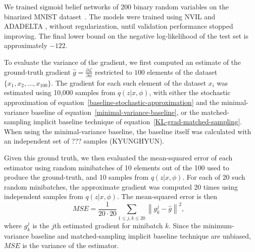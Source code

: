 \documentclass{article} %
\begin{document}
We trained sigmoid belief networks of 200 binary random variables on the binarized MNIST dataset~\cite{salakhutdinov2008quantitative}.  The models were trained using NVIL \cite{mnih2014neural} and ADADELTA \cite{zeiler2012adadelta}, without regularization, until validation performance stopped improving.  The final lower bound on the negative log-likelihood of the test set is approximately $-122$.

To evaluate the variance of the gradient, we first computed an estimate of the ground-truth gradient $\hat{g} = \frac{\partial \mathcal{L}}{\partial \phi}$ restricted to $100$ elements of the dataset $\{x_1, x_2, ..., x_{100}\}$. The gradient for each such element of the dataset $x_i$ was estimated using 10,000 samples from $q(z|x, \phi)$, with either the stochastic approximation of equation~\ref{baseline-stochastic-approximation} and the minimal-variance baseline of equation~\ref{minimal-variance-baseline}, or the matched-sampling implicit baseline technique of equation~\ref{KL-grad-matched-sampling}.  When using the minimal-variance baseline, the baseline itself was calculated with an independent set of ??? samples (KYUNGHYUN).

Given this ground truth, we then evaluated the mean-squared error of each estimator using random minibatches of 10 elements out of the 100 used to produce the ground-truth, and 10 samples from $q(z|x, \phi)$.  For each of 20 such random minibatches, the approximate gradient was computed 20 times using independent samples from $q(z|x, \phi)$.  The mean-squared error is then
\begin{equation*}
MSE = \frac{1}{20 \cdot 20} \sum_{1 \leq j,k \leq 20} \left\|g_k^j - \hat{g} \right\|^2, 
\end{equation*}
where $g_k^j$ is the $j$th estimated gradient for minibatch $k$.  Since the minimum-variance baseline and matched-sampling implicit baseline technique are unbiased, $MSE$ is the variance of the estimator.  %

\begin{comment}
(3) MSE for each baseline technique
  (a) Compute the gradient estimate $g_k^j$ using randomly select 10 inputs out of the 100 inputs $\{x_1, x_2, .., x_{10}\}$ and 10 samples from $q(z|x)$ for each $x_t$
  (b) Repeat (a) for 20 times with the fixed input set to get $\{g_k^1, .., g_k^{20}\}$
  (c) Repeat (a-b) for 20 times to get $\{ g_1^1, g_1^2, .., g_{20}^{20}\}$
  (d) Compute the squared error $\text{SE}_k^j = \| g_k^j - \hat{g} \|_2^2$ for all $k=1,..,20$ and $j=1,..,20$
  (e) The final MSE is $\text{MSE} = \frac{1}{20*20} \sum_{k,j=1}^{20} \text{SE}_k^j,$ and below I also report the standard deviation of the squared errors.
\end{comment}
\end{document}
